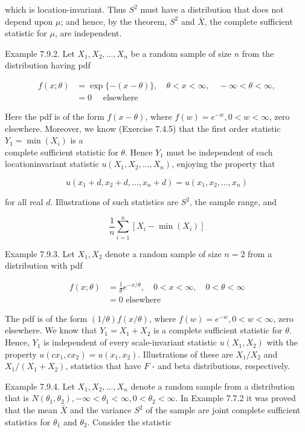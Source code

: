 which is location-invariant. Thus $S^{2}$ must have a distribution that does not depend upon $\mu$; and hence, by the theorem, $S^{2}$ and $\bar{X}$, the complete sufficient statistic for $\mu$, are independent.

Example 7.9.2. Let $X_{1}, X_{2}, \ldots, X_{n}$ be a random sample of size $n$ from the distribution having pdf

$$
\begin{aligned}
f(x ; \theta) & =\exp \{-(x-\theta)\}, \quad \theta<x<\infty, \quad-\infty<\theta<\infty, \\
& =0 \quad \text { elsewhere }
\end{aligned}
$$

Here the pdf is of the form $f(x-\theta)$, where $f(w)=e^{-w}, 0<w<\infty$, zero elsewhere. Moreover, we know (Exercise 7.4.5) that the first order statistic $Y_{1}=\min \left(X_{i}\right)$ is a\\
complete sufficient statistic for $\theta$. Hence $Y_{1}$ must be independent of each locationinvariant statistic $u\left(X_{1}, X_{2}, \ldots, X_{n}\right)$, enjoying the property that

$$
u\left(x_{1}+d, x_{2}+d, \ldots, x_{n}+d\right)=u\left(x_{1}, x_{2}, \ldots, x_{n}\right)
$$

for all real $d$. Illustrations of such statistics are $S^{2}$, the sample range, and

$$
\frac{1}{n} \sum_{i=1}^{n}\left[X_{i}-\min \left(X_{i}\right)\right]
$$

Example 7.9.3. Let $X_{1}, X_{2}$ denote a random sample of size $n=2$ from a distribution with pdf

$$
\begin{aligned}
f(x ; \theta) & =\frac{1}{\theta} e^{-x / \theta}, \quad 0<x<\infty, \quad 0<\theta<\infty \\
& =0 \text { elsewhere }
\end{aligned}
$$

The pdf is of the form $(1 / \theta) f(x / \theta)$, where $f(w)=e^{-w}, 0<w<\infty$, zero elsewhere. We know that $Y_{1}=X_{1}+X_{2}$ is a complete sufficient statistic for $\theta$. Hence, $Y_{1}$ is independent of every scale-invariant statistic $u\left(X_{1}, X_{2}\right)$ with the property $u\left(c x_{1}, c x_{2}\right)=u\left(x_{1}, x_{2}\right)$. Illustrations of these are $X_{1} / X_{2}$ and $X_{1} /\left(X_{1}+X_{2}\right)$, statistics that have $F$ - and beta distributions, respectively.

Example 7.9.4. Let $X_{1}, X_{2}, \ldots, X_{n}$ denote a random sample from a distribution that is $N\left(\theta_{1}, \theta_{2}\right),-\infty<\theta_{1}<\infty, 0<\theta_{2}<\infty$. In Example 7.7.2 it was proved that the mean $\bar{X}$ and the variance $S^{2}$ of the sample are joint complete sufficient statistics for $\theta_{1}$ and $\theta_{2}$. Consider the statistic

